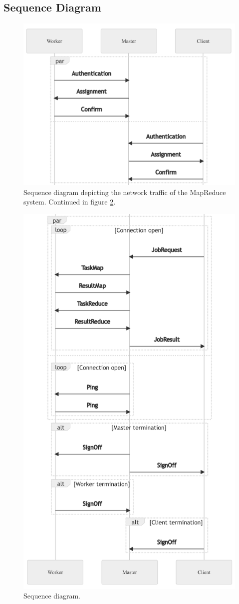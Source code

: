 \documentclass[12pt, letterpaper]{article}
\begin{document}
\subsection{Sequence Diagram}

\begin{figure}[h]
	\centering
	\includegraphics[width=0.6\linewidth]{img/SequenceDiagramPart1}
	\caption{Sequence diagram depicting the network traffic of the MapReduce system. Continued in figure \ref{fig:sequenceDiagramPart2}.}
	\label{fig:sequenceDiagramPart1}
\end{figure}

\begin{figure}[hp]
	\centering
	\includegraphics[width=0.75\linewidth]{img/SequenceDiagramPart2}
	\caption{Sequence diagram.}
	\label{fig:sequenceDiagramPart2}
\end{figure}
\end{document}
